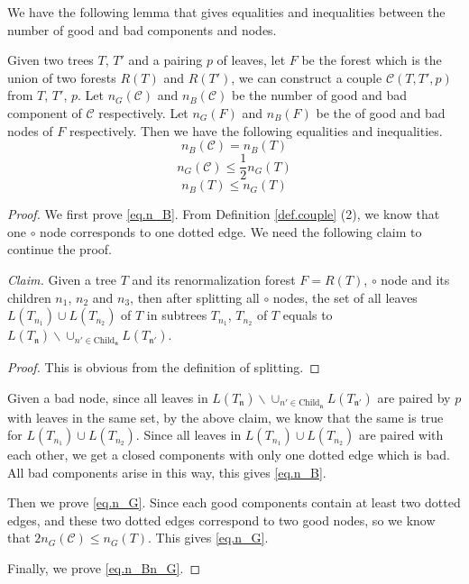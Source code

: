We have the following lemma that gives equalities and inequalities between the number of good and bad components and nodes. 

\begin{lem} Given two trees $T$, $T'$ and a pairing $p$ of leaves, let $F$ be the forest which is the union of two forests $R(T)$ and $R(T')$, we can construct a couple $\mathcal{C}(T,T',p)$ from $T$, $T'$, $p$. Let $n_{G}(\mathcal{C})$ and $n_{B}(\mathcal{C})$ be the number of good and bad component of $\mathcal{C}$ respectively. Let $n_{G}(F)$ and $n_{B}(F)$ be the of good and bad nodes of $F$ respectively. Then we have the following equalities and inequalities.
    \begin{equation}\label{eq.n_B}
        n_{B}(\mathcal{C}) = n_{B}(T)
    \end{equation}
    \begin{equation}\label{eq.n_G}
        n_{G}(\mathcal{C}) \le \frac{1}{2} n_{G}(T)
    \end{equation}
    \begin{equation}\label{eq.n_Bn_G}
        n_{B}(T) \le n_{G}(T)
    \end{equation}
\end{lem}
\begin{proof}
    We first prove \eqref{eq.n_B}. From Definition \ref{def.couple} (2), we know that one $\circ$ node corresponds to one dotted edge. We need the following claim to continue the proof.

    \textit{Claim.} Given a tree $T$ and its renormalization forest $F=R(T)$, $\circ$ node and its children $n_1$, $n_2$ and $n_3$, then after splitting all $\circ$ nodes, the set of all leaves $L(T_{n_1})\cup L(T_{n_2})$ of $T$ in subtrees $T_{n_1}$, $T_{n_2}$ of $T$ equals to $L(T_{\mathfrak{n}})\backslash\cup_{n'\in \text{Child}_{\mathfrak{n}}} L(T_{\mathfrak{n}'})$.

    \begin{proof}
        This is obvious from the definition of splitting.
    \end{proof}

    Given a bad node, since all leaves in $L(T_{\mathfrak{n}})\backslash\cup_{n'\in \text{Child}_{\mathfrak{n}}} L(T_{\mathfrak{n}'})$ are paired by $p$ with leaves in the same set, by the above claim, we know that the same is true for $L(T_{n_1})\cup L(T_{n_2})$. Since all leaves in $L(T_{n_1})\cup L(T_{n_2})$ are paired with each other, we get a closed components with only one dotted edge which is bad. All bad components arise in this way, this gives \eqref{eq.n_B}.


    Then we prove \eqref{eq.n_G}. Since each good components contain at least two dotted edges, and these two dotted edges correspond to two good nodes, so we know that $2n_{G}(\mathcal{C}) \le n_{G}(T)$. This gives \eqref{eq.n_G}.

    Finally, we prove \eqref{eq.n_Bn_G}.

\end{proof}


